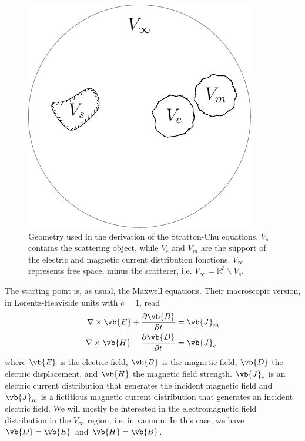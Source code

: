 \documentclass[11pt,SymmetricalJury]{inrsthesis/inrsthesis}
\begin{document}
  \begin{figure}
    \label{fig:sc.scatteringSystem}
    \centering
    \includegraphics{figs/scatteringSystem.pdf}
    \caption[Geometry used in the derivation of the Stratton-Chu equations.]
            {Geometry used in the derivation of the Stratton-Chu equations.
             $V_s$ contains the scattering object, while $V_e$ and $V_m$ are the
             support of the electric and magnetic current distribution fonctions.
             $V_\infty$ represents free space, minus the scatterer, i.e.
             $V_\infty=\mathbb{R}^3\backslash V_s$.}
  \end{figure}

The starting point is, as usual, the Maxwell equations. Their macroscopic version,
in Lorentz-Heaviside units with $c=1$, read
  \begin{subequations}
  \begin{align}
    \nabla\times\vb{E} + \frac{\partial\vb{B}}{\partial t}  &= \vb{J}_m \\
    \nabla\times\vb{H} - \frac{\partial\vb{D}}{\partial t}  &= \vb{J}_e
  \end{align}
  \end{subequations}
where $\vb{E}$ is the electric field, $\vb{B}$ is the magnetic field,
$\vb{D}$ the electric displacement, and $\vb{H}$ the magnetic field strength.
$\vb{J}_e$ is an electric current distribution that generates the incident
magnetic field and $\vb{J}_m$ is a fictitious magnetic current distribution
that generates an incident electric field. We will mostly be interested
in the electromagnetic field distribution in the $V_\infty$ region, i.e.
in vacuum. In this case, we have $\vb{D}=\vb{E}$ and $\vb{H}=\vb{B}$.
\end{document}

